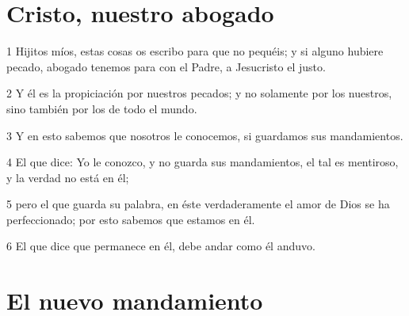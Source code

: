 \section*{Cristo, nuestro abogado}

\par 1 Hijitos míos, estas cosas os escribo para que no pequéis; y si alguno hubiere pecado, abogado tenemos para con el Padre, a Jesucristo el justo.
\par 2 Y él es la propiciación por nuestros pecados; y no solamente por los nuestros, sino también por los de todo el mundo.
\par 3 Y en esto sabemos que nosotros le conocemos, si guardamos sus mandamientos.
\par 4 El que dice: Yo le conozco, y no guarda sus mandamientos, el tal es mentiroso, y la verdad no está en él;
\par 5 pero el que guarda su palabra, en éste verdaderamente el amor de Dios se ha perfeccionado; por esto sabemos que estamos en él.
\par 6 El que dice que permanece en él, debe andar como él anduvo.

\section*{El nuevo mandamiento}

